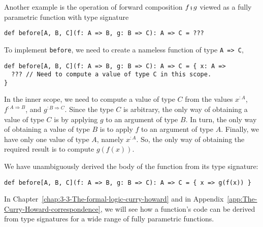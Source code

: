 Another example is the operation of forward composition $f\bef g$
viewed as a fully parametric function with type signature
\begin{lstlisting}
def before[A, B, C](f: A => B, g: B => C): A => C = ???
\end{lstlisting}
To implement \lstinline!before!, we need to create a nameless function
of type \lstinline!A => C!,
\begin{lstlisting}
def before[A, B, C](f: A => B, g: B => C): A => C = { x: A =>
  ??? // Need to compute a value of type C in this scope.
}
\end{lstlisting}
In the inner scope, we need to compute a value of type $C$ from the
values $x^{:A}$, $f^{:A\Rightarrow B}$, and $g^{:B\Rightarrow C}$.
Since the type $C$ is arbitrary, the only way of obtaining a value
of type $C$ is by applying $g$ to an argument of type $B$. In turn,
the only way of obtaining a value of type $B$ is to apply $f$ to
an argument of type $A$. Finally, we have only one value of type
$A$, namely $x^{:A}$. So, the only way of obtaining the required
result is to compute $g(f(x))$.

We have unambiguously derived the body of the function from its type
signature:
\begin{lstlisting}
def before[A, B, C](f: A => B, g: B => C): A => C = { x => g(f(x)) }
\end{lstlisting}

In Chapter~\ref{chap:3-3-The-formal-logic-curry-howard} and in Appendix~\ref{app:The-Curry-Howard-correspondence},
we will see how a function's code can be derived from type signatures
for a wide range of fully parametric functions.
